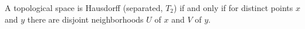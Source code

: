 A topological space is Hausdorff (separated, $T_2$) if and only if for distinct points $x$ and $y$ there are disjoint neighborhoods $U$ of $x$ and $V$ of $y$.
